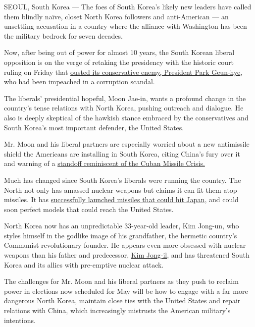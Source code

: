 SEOUL, South Korea --- The foes of South Korea's likely new leaders have
called them blindly naïve, closet North Korea followers and
anti-American --- an unsettling accusation in a country where the
alliance with Washington has been the military bedrock for seven
decades.

Now, after being out of power for almost 10 years, the South Korean
liberal opposition is on the verge of retaking the presidency with the
historic court ruling on Friday that
\href{https://www.nytimes.com/2017/03/09/world/asia/park-geun-hye-impeached-south-korea.html}{ousted
its conservative enemy, President Park Geun-hye}, who had been impeached
in a corruption scandal.

The liberals' presidential hopeful, Moon Jae-in, wants a profound change
in the country's tense relations with North Korea, pushing outreach and
dialogue. He also is deeply skeptical of the hawkish stance embraced by
the conservatives and South Korea's most important defender, the United
States.

Mr. Moon and his liberal partners are especially worried about a new
antimissile shield the Americans are installing in South Korea, citing
China's fury over it and warning of a
\href{https://www.nytimes.com/2017/03/07/world/asia/korea\%2Dmissile\%2Ddefense\%2Dchina\%2Dtrump.html}{standoff
reminiscent of the Cuban Missile Crisis.}

Much has changed since South Korea's liberals were running the country.
The North not only has amassed nuclear weapons but claims it can fit
them atop missiles. It has
\href{https://www.nytimes.com/2017/03/05/world/north-korea-ballistic-missiles.html}{successfully
launched missiles that could hit Japan}, and could soon perfect models
that could reach the United States.

North Korea now has an unpredictable 33-year-old leader, Kim Jong-un,
who styles himself in the godlike image of his grandfather, the hermetic
country's Communist revolutionary founder. He appears even more obsessed
with nuclear weapons than his father and predecessor,
\href{http://www.nytimes.com/2011/12/19/world/asia/kim-jong-il-is-dead.html?pagewanted=all}{Kim
Jong-il}, and has threatened South Korea and its allies with pre-emptive
nuclear attack.

The challenges for Mr. Moon and his liberal partners as they push to
reclaim power in elections now scheduled for May will be how to engage
with a far more dangerous North Korea, maintain close ties with the
United States and repair relations with China, which increasingly
mistrusts the American military's intentions.

